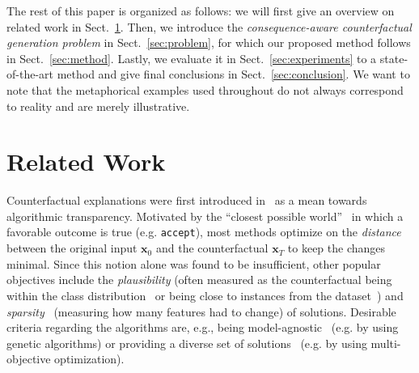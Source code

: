 \documentclass[runningheads, envcountsame, a4paper]{llncs}
\newcommand{\state}{\mathbf{x}}
\newcommand{\initialinstance}{\state_{0}}
\newcommand{\targetclass}{\texttt{accept}}
\newcommand{\finalsolution}{\state_{T}}
\begin{document}
The rest of this paper is organized as follows: we will first give an overview on related work in Sect.~\ref{sec:related_work}. Then, we introduce the \emph{consequence-aware counterfactual generation problem} in Sect.~\ref{sec:problem}, for which our proposed method follows in Sect.~\ref{sec:method}. Lastly, we evaluate it in Sect.~\ref{sec:experiments} to a state-of-the-art method and give final conclusions in Sect.~\ref{sec:conclusion}.
We want to note that the metaphorical examples used throughout do not always correspond to reality and are merely illustrative.

\section{Related Work}
\label{sec:related_work}
Counterfactual explanations were first introduced in~\cite{wachterCounterfactualExplanationsOpening2017} as a mean towards algorithmic transparency. Motivated by the \enquote{closest possible world}~\cite{wachterCounterfactualExplanationsOpening2017} in which a favorable outcome is true (e.g. \targetclass{}), most methods optimize on the \emph{distance} between the original input $\initialinstance$ and the counterfactual $\finalsolution$ to keep the changes minimal. Since this notion alone was found to be insufficient, other popular objectives include the \emph{plausibility} (often measured as the counterfactual being within the class distribution~\cite{joshiRealisticIndividualRecourse2019} or being close to instances from the dataset~\cite{poyiadziFACEFeasibleActionable2020,dandlMultiObjectiveCounterfactualExplanations2020a,vanlooverenInterpretableCounterfactualExplanations2019}) and \emph{sparsity}~\cite{dandlMultiObjectiveCounterfactualExplanations2020a,mothilalExplainingMachineLearning2020,vanlooverenInterpretableCounterfactualExplanations2019} (measuring how many features had to change) of solutions.
Desirable criteria regarding the algorithms are, e.g., being model-agnostic~\cite{dandlMultiObjectiveCounterfactualExplanations2020a,karimiModelAgnosticCounterfactualExplanations2020,lashGeneralizedInverseClassification2017,laugelComparisonBasedInverseClassification2018} (e.g. by using genetic algorithms) or providing a diverse set of solutions~\cite{mothilalExplainingMachineLearning2020,dandlMultiObjectiveCounterfactualExplanations2020a,downsCRUDSCounterfactualRecourse2020,mahajanPreservingCausalConstraints2020} (e.g. by using multi-objective optimization).
\end{document}
